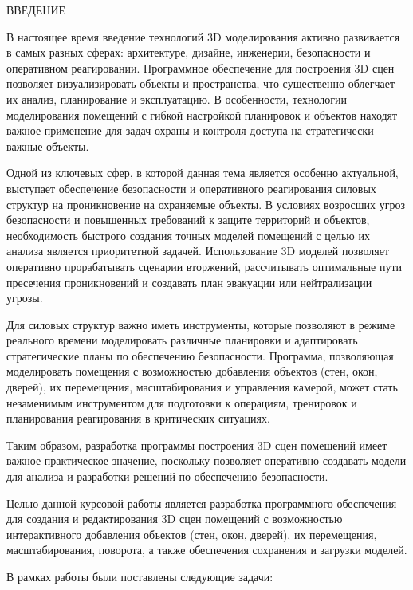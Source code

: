\begin{center}
    \MakeUppercase{\large Введение}
\end{center}

В настоящее время введение технологий 3D моделирования активно развивается в самых разных сферах: архитектуре, дизайне, инженерии, безопасности и оперативном реагировании. Программное обеспечение для построения 3D сцен позволяет визуализировать объекты и пространства, что существенно облегчает их анализ, планирование и эксплуатацию. В особенности, технологии моделирования помещений с гибкой настройкой планировок и объектов находят важное применение для задач охраны и контроля доступа на стратегически важные объекты.

Одной из ключевых сфер, в которой данная тема является особенно актуальной, выступает обеспечение безопасности и оперативного реагирования силовых структур на проникновение на охраняемые объекты. В условиях возросших угроз безопасности и повышенных требований к защите территорий и объектов, необходимость быстрого создания точных моделей помещений с целью их анализа является приоритетной задачей. Использование 3D моделей позволяет оперативно прорабатывать сценарии вторжений, рассчитывать оптимальные пути пресечения проникновений и создавать план эвакуации или нейтрализации угрозы.

Для силовых структур важно иметь инструменты, которые позволяют в режиме реального времени моделировать различные планировки и адаптировать стратегические планы по обеспечению безопасности. Программа, позволяющая моделировать помещения с возможностью добавления объектов (стен, окон, дверей), их перемещения, масштабирования и управления камерой, может стать незаменимым инструментом для подготовки к операциям, тренировок и планирования реагирования в критических ситуациях.

Таким образом, разработка программы построения 3D сцен помещений имеет важное практическое значение, поскольку позволяет оперативно создавать модели для анализа и разработки решений по обеспечению безопасности.

Целью данной курсовой работы является разработка программного обеспечения для создания и редактирования 3D сцен помещений с возможностью интерактивного добавления объектов (стен, окон, дверей), их перемещения, масштабирования, поворота, а также обеспечения сохранения и загрузки моделей.

\vspace{0.25cm}
В рамках работы были поставлены следующие задачи:

